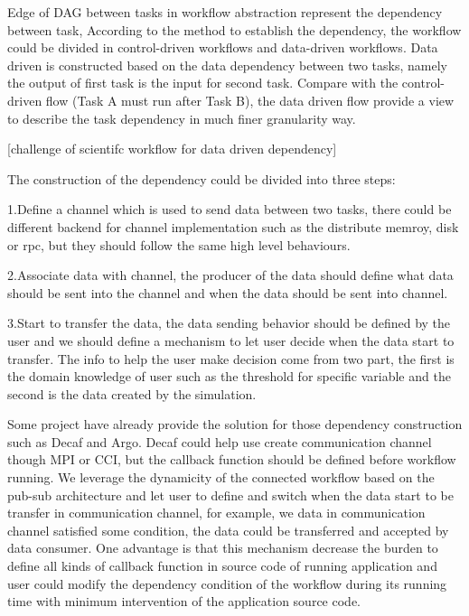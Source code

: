 \documentclass[10pt, conference, compsocconf]{IEEEtran}
\begin{document}
Edge of DAG between tasks in workflow abstraction represent the dependency between task, According to the method to establish the dependency, the workflow could be divided in control-driven workflows and data-driven workflows\cite{shields2007control}. Data driven is constructed based on the data dependency between two tasks, namely the output of first task is the input for second task. Compare with the control-driven flow (Task A must run after Task B), the data driven flow provide a view to describe the task dependency in much finer granularity way.

[challenge of scientifc workflow for data driven dependency]

The construction of the dependency could be divided into three steps:

1.Define a channel which is used to send data between two tasks, there could be different backend for channel implementation such as the distribute memroy, disk or rpc, but they should follow the same high level behaviours.

2.Associate data with channel, the producer of the data should define what data should be sent into the channel and when the data should be sent into channel.

3.Start to transfer the data, the data sending behavior should be defined by the user and we should define a mechanism to let user decide when the data start to transfer. The info to help the user make decision come from two part, the first is the domain knowledge of user such as the threshold for specific variable and the second is the data created by the simulation.

Some project have already provide the solution for those dependency construction such as Decaf \cite{dreher2017decaf} and Argo\cite{perarnau2015distributed}. Decaf could help use create communication channel though MPI or CCI, but the callback function should be defined before workflow running. We leverage the dynamicity of the connected workflow based on the pub-sub architecture and let user to define and switch when the data start to be transfer in communication channel, for example, we data in communication channel satisfied some condition, the data could be transferred and accepted by data consumer. One advantage is that this mechanism decrease the burden to define all kinds of callback function in source code of running application and user could modify the dependency condition of the workflow during its running time with minimum intervention of the application source code.
\end{document}
